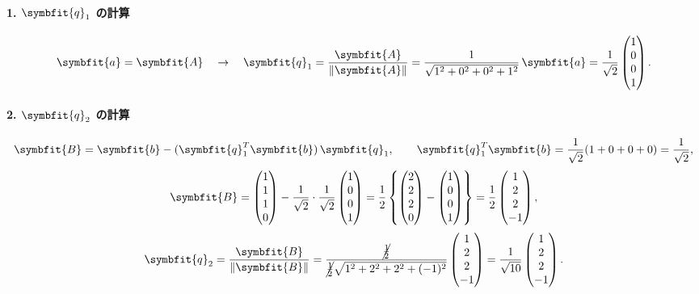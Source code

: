 \paragraph{1. $\symbfit{q}_1$ の計算}
    \[
    \symbfit{a} = \symbfit{A} \quad \rightarrow \quad
    \symbfit{q}_1 = \frac{\symbfit{A}}{\|\symbfit{A}\|}
        = \frac{1}{\sqrt{1^2+0^2+0^2+1^2}}\,\symbfit{a}
        = \frac{1}{\sqrt{2}}\begin{pmatrix}1 \\ 0 \\0 \\ 1\end{pmatrix}.
    \]

    \paragraph{2. $\symbfit{q}_2$ の計算}
    \[
        \symbfit{B} = \symbfit{b} - (\symbfit{q}_1^T \symbfit{b})\,\symbfit{q}_1,
        \qquad
        \symbfit{q}_1^T \symbfit{b} = \frac{1}{\sqrt2}(1+0+0+0)=\frac{1}{\sqrt2},
    \]
    \[
    \symbfit{B}
        = \begin{pmatrix}1 \\ 1 \\ 1 \\ 0\end{pmatrix}
         - \frac{1}{\sqrt2}\cdot\frac{1}{\sqrt2}
        \begin{pmatrix}1 \\ 0 \\ 0 \\ 1\end{pmatrix}
        =\frac{1}{2}\left\{
        \begin{pmatrix} 2 \\ 2 \\ 2 \\ 0 \end{pmatrix}
        - \begin{pmatrix} 1 \\ 0 \\ 0 \\ 1 \end{pmatrix}\right\}
        =\frac{1}{2}
        \begin{pmatrix} 1 \\ 2 \\ 2 \\ -1 \end{pmatrix},
    \]
    \[
        \symbfit{q}_2 = \frac{\symbfit{B}}{\|\symbfit{B}\|}
        = \frac{\cancel{\frac{1}{2}}}{\cancel{\frac{1}{2}}\sqrt{1^2+2^2+2^2+(-1)^2}}
        \begin{pmatrix}1 \\ 2 \\ 2 \\ -1\end{pmatrix}
        = \frac{1}{\sqrt{10}}
        \begin{pmatrix}1 \\ 2 \\ 2 \\ -1\end{pmatrix}.
    \]

